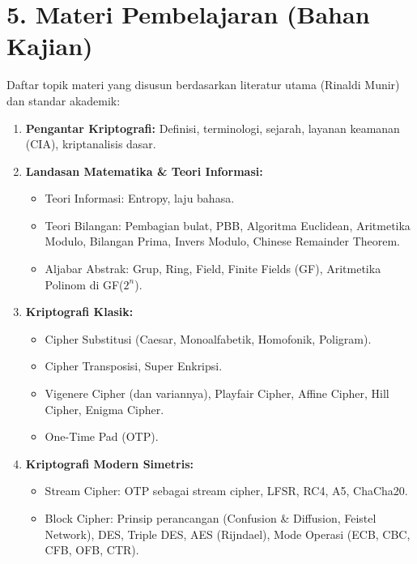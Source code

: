 \documentclass[12pt,a4paper]{article}
\begin{document}
\vspace{0.5cm}

\section*{5. Materi Pembelajaran (Bahan Kajian)}

Daftar topik materi yang disusun berdasarkan literatur utama (Rinaldi Munir) dan standar akademik:

\begin{enumerate}[leftmargin=*]
  \item \textbf{Pengantar Kriptografi:} Definisi, terminologi, sejarah, layanan keamanan (CIA), kriptanalisis dasar.
  \item \textbf{Landasan Matematika \& Teori Informasi:}
    \begin{itemize}
        \item Teori Informasi: Entropy, laju bahasa.
        \item Teori Bilangan: Pembagian bulat, PBB, Algoritma Euclidean, Aritmetika Modulo, Bilangan Prima, Invers Modulo, Chinese Remainder Theorem.
        \item Aljabar Abstrak: Grup, Ring, Field, Finite Fields (GF), Aritmetika Polinom di GF($2^n$).
    \end{itemize}
  \item \textbf{Kriptografi Klasik:} 
    \begin{itemize}
        \item Cipher Substitusi (Caesar, Monoalfabetik, Homofonik, Poligram).
        \item Cipher Transposisi, Super Enkripsi.
        \item Vigenere Cipher (dan variannya), Playfair Cipher, Affine Cipher, Hill Cipher, Enigma Cipher.
        \item One-Time Pad (OTP).
    \end{itemize}
  \item \textbf{Kriptografi Modern Simetris:}
    \begin{itemize}
        \item Stream Cipher: OTP sebagai stream cipher, LFSR, RC4, A5, ChaCha20.
        \item Block Cipher: Prinsip perancangan (Confusion \& Diffusion, Feistel Network), DES, Triple DES, AES (Rijndael), Mode Operasi (ECB, CBC, CFB, OFB, CTR).

\end{itemize}
\end{enumerate}
\end{document}
